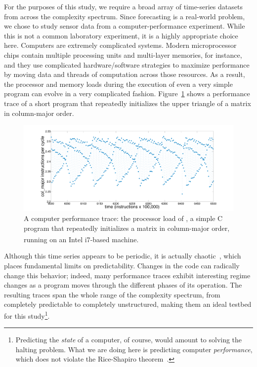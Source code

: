 For the purposes of this study, we require a broad array of
time-series datasets from across the complexity spectrum.  Since
forecasting is a real-world problem, we chose to study sensor data
from a computer-performance experiment.  While this is not a common
laboratory experiment, it is a highly appropriate choice here.
Computers are extremely complicated systems.  Modern microprocessor
chips contain multiple processing units and multi-layer memories, for
instance, and they use complicated hardware/software strategies to
maximize performance by moving data and threads of computation across
those resources.  As a result, the processor and memory loads during
the execution of even a very simple program can evolve in a very
complicated fashion.  Figure~\ref{fig:col-ipc} shows a performance
trace of a short program that repeatedly initializes the upper
triangle of a matrix in column-major order.
%
 \begin{figure}[htbp]
    \centering
    \includegraphics[width=\columnwidth]{figs/colshortts}
    \caption{A computer performance trace: the processor load of \col,
      a simple C program that repeatedly initializes a matrix in
      column-major order, running on an Intel
      i7\textsuperscript{\textregistered}-based machine.}
   \label{fig:col-ipc}
  \end{figure}
%
Although this time series appears to be periodic, it is actually
chaotic~\cite{mytkowicz09}, which places fundamental limits on
predictability.  Changes in the code can radically change this
behavior; indeed, many performance traces exhibit interesting regime
changes as a program moves through the different phases of its
operation.  The resulting traces span the whole range of the
complexity spectrum, from completely predictable to completely
unstructured, making them an ideal testbed for this
study\footnote{Predicting the \emph{state} of a computer, of course,
  would amount to solving the halting problem.  What we are doing here
  is predicting computer \emph{performance}, which does not violate
  the Rice-Shapiro theorem~\cite{hopcroft2007}.}.

